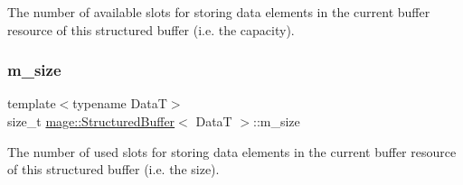 The number of available slots for storing data elements in the current buffer resource of this structured buffer (i.\+e. the capacity). \hypertarget{classmage_1_1_structured_buffer_afcf4b378401dc1060f133ea7249edf19}{}\label{classmage_1_1_structured_buffer_afcf4b378401dc1060f133ea7249edf19} 
\subsubsection{\texorpdfstring{m\+\_\+size}{m\_size}}
{\footnotesize\ttfamily template$<$typename DataT$>$ \\
size\+\_\+t \hyperlink{classmage_1_1_structured_buffer}{mage\+::\+Structured\+Buffer}$<$ DataT $>$\+::m\+\_\+size\hspace{0.3cm}{\ttfamily [private]}}

The number of used slots for storing data elements in the current buffer resource of this structured buffer (i.\+e. the size). 
